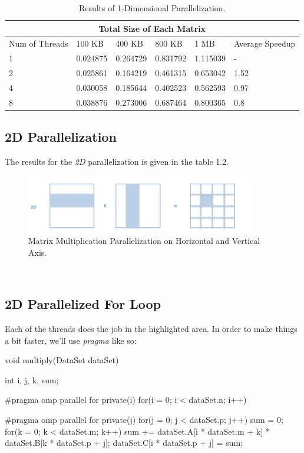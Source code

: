 \documentclass[12pt]{article}
\numberwithin{equation}{section}
\numberwithin{table}{section}
\numberwithin{figure}{section}
\begin{document}
\def\arraystretch{1.3}
\begin{table}[!h]
		\centering
\begin{tabular}{ |p{3cm}||p{2cm}|p{2cm}|p{2cm}|p{2cm}|p{1.5cm}|  }
	
	\hline
	\multicolumn{6}{|c|}{Total Size of Each Matrix} \\
	\hline
	 Num of Threads & 100 KB & 400 KB & 800 KB & 1 MB & Average Speedup\\
	\hline
		1   & 0.024875    & 0.264729 & 0.831792 &   1.115039&   -\\
		2   & 0.025861    & 0.164219 & 0.461315 &   0.653042 &   1.52\\
		4   & 0.030058    & 0.185644 & 0.402523 &   0.562593&   0.97\\
		8   & 0.038876    & 0.273006 & 0.687464 &   0.800365& 0.8\\
	\hline
\end{tabular}
	\caption{Results of 1-Dimensional Parallelization.}
\label{figsolplot}
\end{table}
\newpage
\subsection{2D Parallelization}
The results for the \textit{2D} parallelization is given in the table 1.2.
\begin{figure}[!h]\centering
	\includegraphics[width=0.9\textwidth]{two_dimensional.png}
	\caption{Matrix Multiplication Parallelization on Horizontal and Vertical Axis.}
	\label{figsolplot}
\end{figure}\\
\subsection{2D Parallelized For Loop}
Each of the threads does the job in the highlighted area.
In order to make things a bit faster, we'll use \textit{pragma} like so:
\begin{cpp}
		void multiply(DataSet dataSet){
			int i, j, k, sum;
			
			#pragma omp parallel for private(i)
			for(i = 0; i < dataSet.n; i++){
				
				#pragma omp parallel for private(j)
				for(j = 0; j < dataSet.p; j++){
					sum = 0;
					for(k = 0; k < dataSet.m; k++){
						sum += dataSet.A[i * dataSet.m + k] * dataSet.B[k * dataSet.p + j];
					}
					dataSet.C[i * dataSet.p + j] = sum;
				}
			}
		}
\end{cpp}
\end{document}
